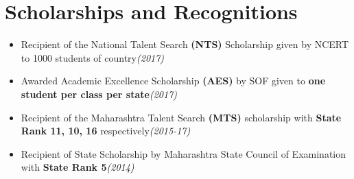 \documentclass[10pt,a4paper,sans]{moderncv}        %
\newcommand{\rhsmall}[1]{\hfill{\footnotesize{\textsl{(#1)}}}}
\begin{document}
\section{Scholarships and Recognitions}
\begin{itemize}
	\item Recipient of the National Talent Search \textbf{(NTS)} Scholarship given by NCERT to 1000 students of country\rhsmall{2017}
	\item Awarded Academic Excellence Scholarship \textbf{(AES)} by SOF given to \textbf{one  student per class per state}\rhsmall{2017}
	\item Recipient of the Maharashtra Talent Search \textbf{(MTS)} scholarship  with \textbf{State Rank 11, 10, 16} respectively\rhsmall{2015-17}%
	\item Recipient of State Scholarship by Maharashtra State Council of Examination with \textbf{State Rank 5}\rhsmall{2014}
\end{itemize}
\end{document}
